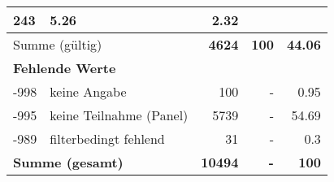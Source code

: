 \begin{longtable}{lXrrr}
       \num{243} &
       \num[round-mode=places,round-precision=2]{5,26} &
         \num[round-mode=places,round-precision=2]{2,32} \\
     \midrule
     \multicolumn{2}{l}{Summe (gültig)} &
       \textbf{\num{4624}} &
     \textbf{100} &
       \textbf{\num[round-mode=places,round-precision=2]{44,06}} \\
     \multicolumn{5}{l}{\textbf{Fehlende Werte}}\\
       -998 &
       keine Angabe &
         \num{100} &
        - &
         \num[round-mode=places,round-precision=2]{0,95} \\
       -995 &
       keine Teilnahme (Panel) &
         \num{5739} &
        - &
         \num[round-mode=places,round-precision=2]{54,69} \\
       -989 &
       filterbedingt fehlend &
         \num{31} &
        - &
         \num[round-mode=places,round-precision=2]{0,3} \\
     \midrule
     \multicolumn{2}{l}{\textbf{Summe (gesamt)}} &
          \textbf{\num{10494}} &
        \textbf{-} &
        \textbf{100} \\
     \bottomrule
     \end{longtable}
     
